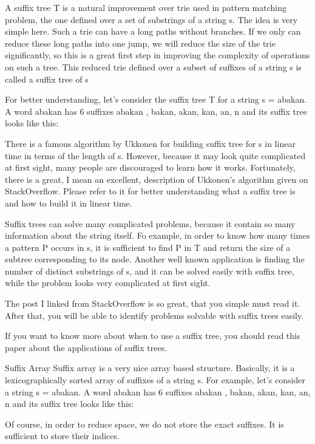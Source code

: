 A suffix tree T is a natural improvement over trie used in pattern matching problem, the one defined over a set of substrings of a string s. The idea is very simple here. Such a trie can have a long paths without branches. If we only can reduce these long paths into one jump, we will reduce the size of the trie significantly, so this is a great first step in improving the complexity of operations on such a tree. This reduced trie defined over a subset of suffixes of a string s is called a suffix tree of s

For better understanding, let's consider the suffix tree T for a string s = abakan. A word abakan has 6 suffixes {abakan , bakan, akan, kan, an, n} and its suffix tree looks like this:



There is a famous algorithm by Ukkonen for building suffix tree for s in linear time in terms of the length of s. However, because it may look quite complicated at first sight, many people are discouraged to learn how it works. Fortunately, there is a great, I mean an excellent, description of Ukkonen's algorithm given on StackOverflow. Please refer to it for better understanding what a suffix tree is and how to build it in linear time.

Suffix trees can solve many complicated problems, because it contain so many information about the string itself. Fo example, in order to know how many times a pattern P occurs in s, it is sufficient to find P in T and return the size of a subtree corresponding to its node. Another well known application is finding the number of distinct substrings of s, and it can be solved easily with suffix tree, while the problem looks very complicated at first sight.

The post I linked from StackOverflow is so great, that you simple must read it. After that, you will be able to identify problems solvable with suffix trees easily.

If you want to know more about when to use a suffix tree, you should read this paper about the applications of suffix trees.

Suffix Array
Suffix array is a very nice array based structure. Basically, it is a lexicographically sorted array of suffixes of a string s. For example, let's consider a string s = abakan. A word abakan has 6 suffixes {abakan , bakan, akan, kan, an, n} and its suffix tree looks like this:



Of course, in order to reduce space, we do not store the exact suffixes. It is sufficient to store their indices.

